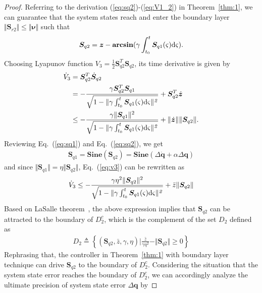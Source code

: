 \documentclass[3p]{elsarticle}
\theoremstyle{plain}
\theoremstyle{remark}
\begin{document}
\begin{proof}
Referring to the derivation (\ref{eq:sq2})-(\ref{eq:V1_2}) in Theorem~\ref{thm:1}, we can guarantee that the system states reach and enter the boundary layer $\Vert\bm{ S}_{r2}\Vert \le \Vert\bm\nu\Vert$ such that
\begin{align}
\bm S_{q2}=\bm z-\mathbf{arcsin}(\gamma\int^t_{t_0}\bm S_{q1}(\varsigma) \rm{d}\it{\varsigma}).
\end{align}
Choosing Lyapunov function $V_3=\frac{1}{2}\bm{ S}_{q2}^T\bm{ S}_{q2}$, its time derivative is given by
\begin{align}\begin{split}
\dot V_3&=\bm{ S}_{q2}^T\dot{\bm{S}}_{q2}\\
&=-\frac{\gamma \bm S_{q2}^T\bm S_{q1}}{\sqrt{1-\Vert\gamma\int^t_{t_0}\bm S_{q1}(\varsigma) \rm{d}\it{\varsigma\Vert^2}}}+\bm{ S}_{q2}^T\dot{\bm z}\\
&\le -\frac{\gamma \Vert \bm S_{q1}\Vert^2}{\sqrt{1-\Vert\gamma\int^t_{t_0}\bm S_{q1}(\varsigma) \rm{d}\it{\varsigma\Vert^2}}}+\Vert\dot{\bm{z}}\Vert\Vert\bm{ S}_{q2}\Vert.\label{eq:v3}
\end{split}\end{align}
Reviewing Eq.~(\ref{eq:sq1}) and Eq.~(\ref{eq:sq2}), we get
\begin{align}
\bm S_{q1}=\mathbf{Sine}(\bm S_{q2})=\mathbf{Sine}(\Delta\dot{\bm q}+\alpha\Delta\bm q)
\end{align}
and since $\Vert\bm S_{q1}\Vert=\eta\Vert\bm S_{q2}\Vert$, Eq.~(\ref{eq:v3}) can be rewritten as
\begin{align}
  \dot V_3\le -\frac{\gamma\eta^2 \Vert \bm S_{q2}\Vert^2}{\sqrt{1-\Vert\gamma\int^t_{t_0}\bm S_{q1}(\varsigma) \rm{d}\it{\varsigma\Vert^2}}}+\bar{z}\Vert\bm{ S}_{q2}\Vert
\end{align}
Based on LaSalle theorem~\cite{lasalle1960some}, the above expression implies that $\bm S_{q2}$ can be attracted to the boundary of $D_2^c$, which is the complement of the set $D_2$ defined as
\begin{align}
  D_2\triangleq\left\{(\bm S_{q2},\bar z,\gamma,\eta)\Big\vert \frac{\bar z}{\gamma\eta^2}-\Vert \bm S_{q2}\Vert\ge 0\right\}
\end{align}
Rephrasing that, the controller in Theorem~\ref{thm:1} with boundary layer technique can drive $\bm S_{q2}$ to the boundary of $D_2^c$. Considering the situation that the system state error reaches the boundary of $D_2^c$, we can accordingly analyze the ultimate precision of system state error $\Delta\bm q$ by

\end{proof}
\end{document}
